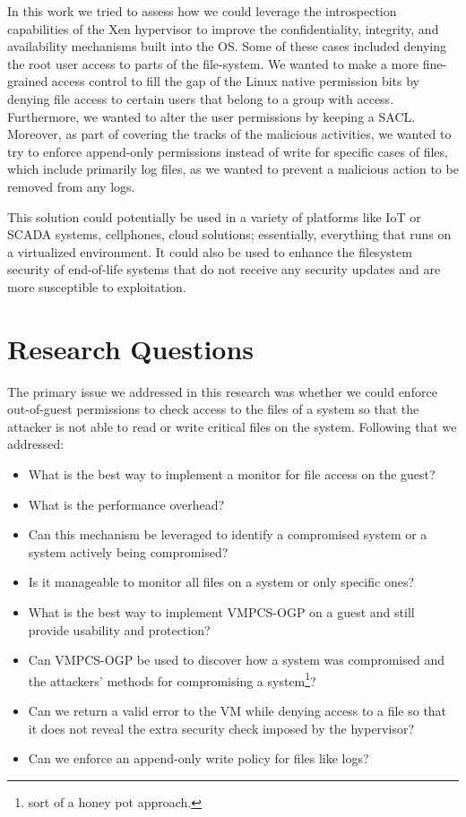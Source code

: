 \par In this work we tried to assess how we could leverage the introspection capabilities of the Xen hypervisor to improve the confidentiality, integrity, and availability mechanisms built into the \ac{OS}. Some of these cases included denying the root user access to parts of the file-system. We wanted to make a more fine-grained access control to fill the gap of the Linux native permission bits by denying file access to certain users that belong to a group with access. Furthermore, we wanted to alter the user permissions by keeping a \ac{SACL}. Moreover, as part of covering the tracks of the malicious activities, we wanted to try to enforce append-only permissions instead of write for specific cases of files, which include primarily log files, as we wanted to prevent a malicious action to be removed from any logs. 

\par This solution could potentially be used in a variety of platforms like \ac{IoT} or \ac{SCADA} systems, cellphones, cloud solutions; essentially, everything that runs on a virtualized environment. It could also be used to enhance the filesystem security of end-of-life systems that do not receive any security updates and are more susceptible to exploitation.

\section{Research Questions}\label{sec:question}
\par The primary issue we addressed in this research was whether we could enforce out-of-guest permissions to check access to the files of a system so that the attacker is not able to read or write critical files on the system. Following that we addressed:
\begin{itemize}
	\item What is the best way to implement a monitor for file access on the guest?
	\item What is the performance overhead?
	\item Can this mechanism be leveraged to identify a compromised system or a system actively being compromised?
	\item Is it manageable to monitor all files on a system or only specific ones?
	\item What is the best way to implement \ac{VMPCS-OGP} on a guest and still provide usability and protection?
	\item Can \ac{VMPCS-OGP} be used to discover how a system was compromised and the attackers' methods for compromising a system\footnote{sort of a honey pot approach.}?
	\item Can we return a valid error to the VM while denying access to a file so that it does not reveal the extra security check imposed by the hypervisor?
	\item Can we enforce an append-only write policy for files like logs?
\end{itemize}

